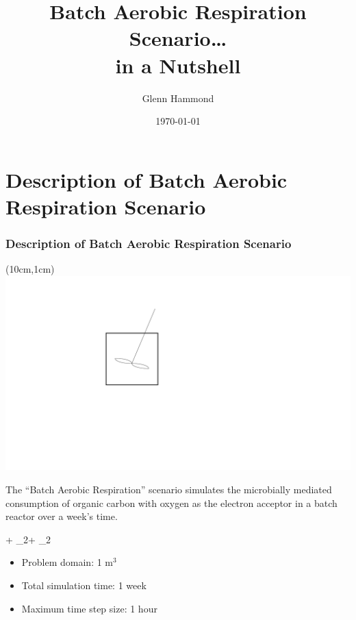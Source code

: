 \documentclass{beamer}
\def\EQ#1\EN{\begin{equation*}#1\end{equation*}}
\newcommand{\oxygen}{{\text{O}_2}}
\newcommand{\organiccarbon}{{\text{CH}_2\text{O}}}
\newcommand{\carbondioxide}{{\text{CO}_2}}
\newcommand{\water}{{\text{H}_2\text{O}}}
\begin{document}
\title{Batch Aerobic Respiration Scenario\ldots\\in a Nutshell}
\author{Glenn Hammond}
\date{\today}

\frame{\titlepage}


\section{Description of Batch Aerobic Respiration Scenario}

\begin{frame}\frametitle{Description of Batch Aerobic Respiration Scenario}

\begin{textblock*}{5cm}(10cm,1cm) %
  \includegraphics[width=0.3\linewidth]{./reactor_fig}
\end{textblock*}
\vspace{1cm}
The ``Batch Aerobic Respiration'' scenario simulates the microbially mediated consumption of organic carbon with oxygen as the electron acceptor in a batch reactor over a week's time.

\EQ
\oxygen + \organiccarbon \rightarrow \carbondioxide + \water
\EN

\begin{itemize}
  \item Problem domain: 1 m$^3$
  \item Total simulation time: 1 week
  \item Maximum time step size: 1 hour
\end{itemize}

\end{frame}
\end{document}
